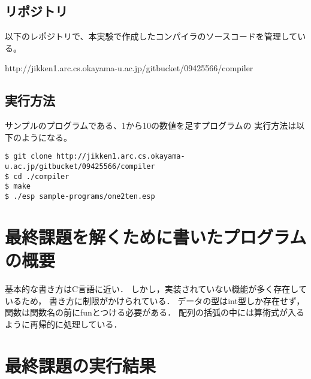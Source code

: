 \documentclass[11pt,a4j]{jarticle}
\begin{document}
\subsection{リポジトリ}

以下のレポジトリで、本実験で作成したコンパイラのソースコードを管理している。

http://jikken1.arc.cs.okayama-u.ac.jp/gitbucket/09425566/compiler


\subsection{実行方法}

サンプルのプログラムである、1から10の数値を足すプログラムの
実行方法は以下のようになる。

\begin{verbatim}
$ git clone http://jikken1.arc.cs.okayama-u.ac.jp/gitbucket/09425566/compiler
$ cd ./compiler
$ make 
$ ./esp sample-programs/one2ten.esp
\end{verbatim}



\section{最終課題を解くために書いたプログラムの概要}

基本的な書き方はC言語に近い．
しかし，実装されていない機能が多く存在しているため，
書き方に制限がかけられている．
データの型はint型しか存在せず，関数は関数名の前にfunとつける必要がある．
配列の括弧の中には算術式が入るように再帰的に処理している．



\section{最終課題の実行結果} %
\end{document}
